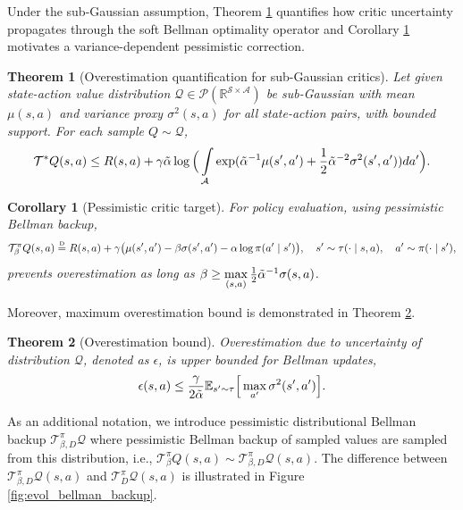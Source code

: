 \documentclass{article}
\newtheorem{theorem}{Theorem}[section]
\newtheorem{corollary}{Corollary}[theorem]
\newcommand\disteq{\mathrel{\stackrel{\makebox[0pt]{\mbox{\normalfont\tiny D}}}{=}}}
\begin{document}
Under the sub-Gaussian assumption, Theorem \ref{thm:overestimation} quantifies how critic uncertainty propagates through the soft Bellman optimality operator and Corollary \ref{cor:pessimism} motivates a variance-dependent pessimistic correction.

\begin{theorem}[Overestimation quantification for sub-Gaussian critics]
	\label{thm:overestimation}
	Let given state-action value distribution $\mathcal{Q}\in\mathcal{P}(\mathbb{R}^{\mathcal{S}\times\mathcal{A}})$ be sub-Gaussian with mean $\mu(s,a)$ and variance proxy $\sigma^2(s,a)$ for all state-action pairs, with bounded support. For each sample $Q\sim\mathcal{Q}$,  
	\begin{equation}
		\mathcal{T}^{*} Q(s,a) \leq R(s,a) + \gamma \Tilde{\alpha} \log \Big( \int\limits_{\mathcal{A}} \exp( {\Tilde{\alpha}}^{-1} \mu(s',a') + \frac{1}{2} {\Tilde{\alpha}}^{-2} \sigma^2(s',a') ) da' \Big). \\
	\end{equation}
\end{theorem}

\begin{corollary}[Pessimistic critic target]
	\label{cor:pessimism}
	For policy evaluation, using pessimistic Bellman backup, 
	\begin{equation}
		\label{eqn:q_evs_eval_pessimistic}
		\mathcal{T}_{\beta}^{\pi} Q(s,a) \disteq R(s,a) + \gamma \big( \mu(s',a') - \beta \sigma(s',a') - \alpha \log \pi(a' \mid s') \big), \quad s'\sim\tau(\cdot \mid s,a), \quad a' \sim \pi(\cdot \mid s'), 
	\end{equation}
	prevents overestimation as long as $\beta \geq \max\limits_{(s, a)} \frac{1}{2}{\Tilde{\alpha}}^{-1} \sigma(s, a)$. 
\end{corollary}

Moreover, maximum overestimation bound is demonstrated in Theorem \ref{thm:overestimation_bound}.

\begin{theorem}[Overestimation bound]
	\label{thm:overestimation_bound}
	Overestimation due to uncertainty of distribution $\mathcal{Q}$, denoted as $\epsilon$, is upper bounded for Bellman updates, 
	\begin{align}
		\epsilon(s,a) \leq \frac{\gamma}{2\Tilde{\alpha}} \mathbb{E}_{s'\sim\tau} \Big[ \max_{a'} \sigma^2(s',a') \Big]. 
	\end{align} 
\end{theorem}

As an additional notation, we introduce pessimistic distributional Bellman backup $\mathcal{T}_{\beta, D}^{\pi}\mathcal{Q}$ where pessimistic Bellman backup of sampled values are sampled from this distribution, i.e.,  $\mathcal{T}_{\beta}^{\pi} Q(s,a) \sim \mathcal{T}^{\pi}_{\beta, D}\mathcal{Q}(s, a)$. The difference between $\mathcal{T}^{\pi}_{\beta, D}\mathcal{Q}(s, a)$ and $\mathcal{T}^{\pi}_{D}\mathcal{Q}(s, a)$ is illustrated in Figure \ref{fig:evol_bellman_backup}. 
\end{document}
